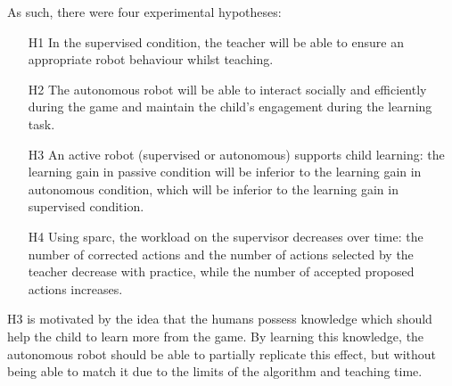 
As such, there were four experimental hypotheses:
\begin{itemize}
	\item [H1] In the supervised condition, the teacher will be able to ensure an appropriate robot behaviour whilst teaching.
	\item [H2] The autonomous robot will be able to interact socially and efficiently during the game and maintain the child's engagement during the learning task.
	\item [H3] An active robot (supervised or autonomous) supports child learning: the learning gain in passive condition will be inferior to the learning gain in autonomous condition, which will be inferior to the learning gain in supervised condition.
	\item [H4] Using \gls{sparc}, the workload on the supervisor decreases over time: the number of corrected actions and the number of actions selected  by the teacher decrease with practice, while the number of accepted proposed actions increases.
\end{itemize}

H3 is motivated by the idea that the humans possess knowledge which should help the child to learn more from the game. By learning this knowledge, the autonomous robot should be able to partially replicate this effect, but without being able to match it due to the limits of the algorithm and teaching time.

